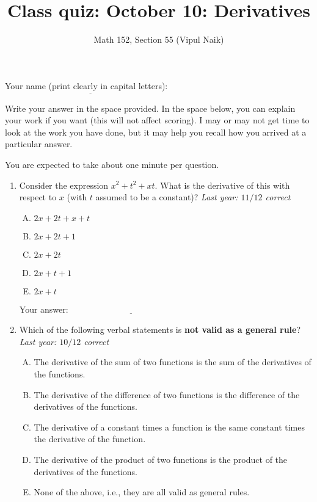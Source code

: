 \documentclass[10pt]{amsart}
\title{Class quiz: October 10: Derivatives}
\author{Math 152, Section 55 (Vipul Naik)}
\begin{document}
\maketitle

Your name (print clearly in capital letters): $\underline{\qquad\qquad\qquad\qquad\qquad\qquad\qquad\qquad\qquad\qquad}$

Write your answer in the space provided. In the space below, you can
explain your work if you want (this will not affect scoring). I may or
may not get time to look at the work you have done, but it may help
you recall how you arrived at a particular answer.

You are expected to take about one minute per question.

\begin{enumerate}

\item Consider the expression $x^2 + t^2 + xt$. What is the derivative
  of this with respect to $x$ (with $t$ assumed to be a constant)?
  {\em Last year: $11/12$ correct}

  \begin{enumerate}[(A)]

  \item $2x + 2t + x + t$
  \item $2x + 2t + 1$
  \item $2x + 2t$
  \item $2x + t + 1$
  \item $2x + t$
  \end{enumerate}

  \vspace{0.1in}
  Your answer: $\underline{\qquad\qquad\qquad\qquad\qquad\qquad\qquad}$
  \vspace{1.5in}

\item Which of the following verbal statements is {\bf not valid as a
  general rule}? {\em Last year: $10/12$ correct}

  \begin{enumerate}[(A)]
  \item The derivative of the sum of two functions is the sum of the
    derivatives of the functions.
  \item The derivative of the difference of two functions is the
    difference of the derivatives of the functions.
  \item The derivative of a constant times a function is the same
    constant times the derivative of the function.
  \item The derivative of the product of two functions is the product
    of the derivatives of the functions.
  \item None of the above, i.e., they are all valid as general rules.
  \end{enumerate}


\end{enumerate}
\end{document}
